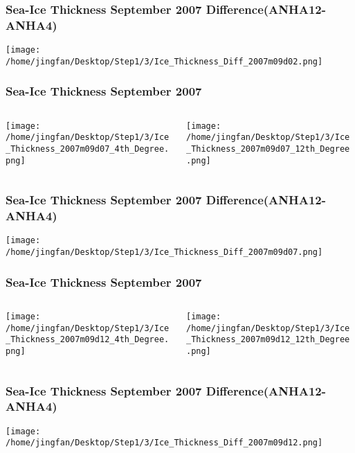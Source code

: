 \documentclass{beamer}
\begin{document}
\begin{frame}
\frametitle{Sea-Ice Thickness September 2007 Difference(ANHA12-ANHA4)}

\texttt{[image: /home/jingfan/Desktop/Step1/3/Ice\_Thickness\_Diff\_2007m09d02.png]}

\end{frame}

\begin{frame}
\frametitle{Sea-Ice Thickness September 2007}

\begin{columns}
\begin{column}[t]{0.5\linewidth}
\centering
\texttt{[image: /home/jingfan/Desktop/Step1/3/Ice\_Thickness\_2007m09d07\_4th\_Degree.png]}
\end{column}
\begin{column}[t]{0.5\linewidth}
\centering
\texttt{[image: /home/jingfan/Desktop/Step1/3/Ice\_Thickness\_2007m09d07\_12th\_Degree.png]}
\end{column}
\end{columns}

\end{frame}

\begin{frame}
\frametitle{Sea-Ice Thickness September 2007 Difference(ANHA12-ANHA4)}

\texttt{[image: /home/jingfan/Desktop/Step1/3/Ice\_Thickness\_Diff\_2007m09d07.png]}

\end{frame}

\begin{frame}
\frametitle{Sea-Ice Thickness September 2007}

\begin{columns}
\begin{column}[t]{0.5\linewidth}
\centering
\texttt{[image: /home/jingfan/Desktop/Step1/3/Ice\_Thickness\_2007m09d12\_4th\_Degree.png]}
\end{column}
\begin{column}[t]{0.5\linewidth}
\centering
\texttt{[image: /home/jingfan/Desktop/Step1/3/Ice\_Thickness\_2007m09d12\_12th\_Degree.png]}
\end{column}
\end{columns}

\end{frame}

\begin{frame}
\frametitle{Sea-Ice Thickness September 2007 Difference(ANHA12-ANHA4)}

\texttt{[image: /home/jingfan/Desktop/Step1/3/Ice\_Thickness\_Diff\_2007m09d12.png]}

\end{frame}
\end{document}
